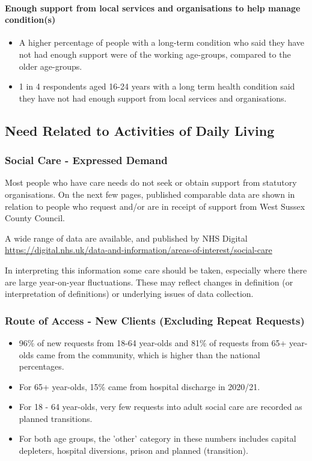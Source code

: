 \paragraph{Enough support from local services and organisations to help manage condition(s)} 
\begin{itemize}
    \item A higher percentage of people with a long-term condition who said they have not had enough support were of the working age-groups, compared to the older age-groups.
    \item 1 in 4 respondents aged 16-24 years with a long term health condition said they have not had enough support from local services and organisations.
\end{itemize}

\subsection{Need Related to Activities of Daily Living}
\subsubsection{Social Care - Expressed Demand}
Most people who have care needs do not seek or obtain support from statutory organisations. On the next few pages, published comparable data are shown in relation to people who request and/or are in receipt of support from West Sussex County Council.

A wide range of data are available, and published by NHS Digital \url{https://digital.nhs.uk/data-and-information/areas-of-interest/social-care}

In interpreting this information some care should be taken, especially where there are large year-on-year fluctuations. These may reflect changes in definition (or interpretation of definitions) or underlying issues of data collection.

\subsubsection{Route of Access - New Clients (Excluding Repeat Requests)}
\begin{itemize}[noitemsep]
    \item 96\% of new requests from 18-64 year-olds and 81\% of requests from 65+ year-olds came from the community, which is higher than the national percentages.
    \item For 65+ year-olds, 15\% came from hospital discharge in 2020/21.
    \item For 18 - 64 year-olds, very few requests into adult social care are recorded as planned transitions.
    \item For both age groups, the 'other' category in these numbers includes capital depleters, hospital diversions, prison and planned (transition). 
\end{itemize}

